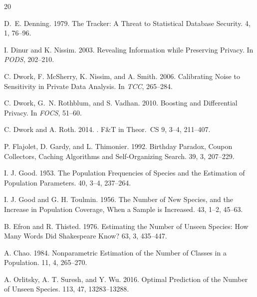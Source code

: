 \documentclass[sigconf,nonacm]{acmart}
\begin{document}
\begin{thebibliography}{20}

D.~E. Denning. 1979.
\newblock The Tracker: A Threat to Statistical Database Security.
 4, 1, 76--96.

I. Dinur and K. Nissim. 2003.
\newblock Revealing Information while Preserving Privacy.
\newblock In {\em PODS}, 202--210.

C. Dwork, F. McSherry, K. Nissim, and A. Smith. 2006.
\newblock Calibrating Noise to Sensitivity in Private Data Analysis.
\newblock In {\em TCC}, 265--284.

C. Dwork, G.~N. Rothblum, and S. Vadhan. 2010.
\newblock Boosting and Differential Privacy.
\newblock In {\em FOCS}, 51--60.

C. Dwork and A. Roth. 2014.
.
\newblock F\&T in Theor.\ CS 9, 3--4, 211--407.

P. Flajolet, D. Gardy, and L. Thimonier. 1992.
\newblock Birthday Paradox, Coupon Collectors, Caching Algorithms and Self-Organizing Search.
 39, 3, 207--229.

I. J. Good. 1953.
\newblock The Population Frequencies of Species and the Estimation of Population Parameters.
 40, 3--4, 237--264.

I. J. Good and G. H. Toulmin. 1956.
\newblock The Number of New Species, and the Increase in Population Coverage, When a Sample is Increased.
 43, 1--2, 45--63.

B. Efron and R. Thisted. 1976.
\newblock Estimating the Number of Unseen Species: How Many Words Did Shakespeare Know?
 63, 3, 435--447.

A. Chao. 1984.
\newblock Nonparametric Estimation of the Number of Classes in a Population.
 11, 4, 265--270.

A. Orlitsky, A. T. Suresh, and Y. Wu. 2016.
\newblock Optimal Prediction of the Number of Unseen Species.
 113, 47, 13283--13288.


\end{thebibliography}
\end{document}
